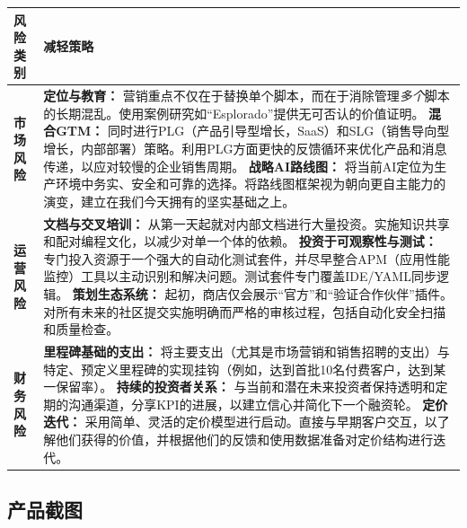 \documentclass[11pt, a4paper, oneside]{article}
\begin{document}
\begin{table}[H]
\centering
\begin{tabularx}{\textwidth}{@{}lL@{}}
\toprule
\textbf{风险类别} & \textbf{减轻策略} \\
\midrule
\textbf{市场风险} & 
\textbf{定位与教育：} 营销重点不仅在于替换单个脚本，而在于消除管理\textit{多个}脚本的长期混乱。使用案例研究如“Esplorado”提供无可否认的价值证明。 \newline\newline
\textbf{混合GTM：} 同时进行PLG（产品引导型增长，SaaS）和SLG（销售导向型增长，内部部署）策略。利用PLG方面更快的反馈循环来优化产品和消息传递，以应对较慢的企业销售周期。 \newline\newline
\textbf{战略AI路线图：} 将当前AI定位为生产环境中务实、安全和可靠的选择。将路线图框架视为朝向更自主能力的演变，建立在我们今天拥有的坚实基础之上。 \\
\addlinespace
\textbf{运营风险} & 
\textbf{文档与交叉培训：} 从第一天起就对内部文档进行大量投资。实施知识共享和配对编程文化，以减少对单一个体的依赖。 \newline\newline
\textbf{投资于可观察性与测试：} 专门投入资源于一个强大的自动化测试套件，并尽早整合APM（应用性能监控）工具以主动识别和解决问题。测试套件专门覆盖IDE/YAML同步逻辑。 \newline\newline
\textbf{策划生态系统：} 起初，商店仅会展示“官方”和“验证合作伙伴”插件。对所有未来的社区提交实施明确而严格的审核过程，包括自动化安全扫描和质量检查。 \\
\addlinespace
\textbf{财务风险} & 
\textbf{里程碑基础的支出：} 将主要支出（尤其是市场营销和销售招聘的支出）与特定、预定义里程碑的实现挂钩（例如，达到首批10名付费客户，达到某一保留率）。 \newline\newline
\textbf{持续的投资者关系：} 与当前和潜在未来投资者保持透明和定期的沟通渠道，分享KPI的进展，以建立信心并简化下一个融资轮。 \newline\newline
\textbf{定价迭代：} 采用简单、灵活的定价模型进行启动。直接与早期客户交互，以了解他们获得的价值，并根据他们的反馈和使用数据准备对定价结构进行迭代。 \\
\bottomrule
\end{tabularx}
\end{table}

\newpage
\subsection{产品截图}
\end{document}
